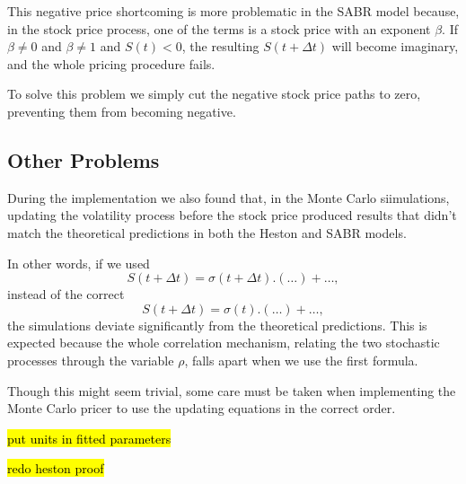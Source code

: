 This negative price shortcoming is more problematic in the SABR model because, in the stock price process, one of the terms is a stock price with an exponent $\beta$. If $\beta\neq0$ and $\beta\neq1$ and $S(t)<0$, the resulting $S(t+\Delta t)$ will become imaginary, and the whole pricing procedure fails.

To solve this problem we simply cut the negative stock price paths to zero, preventing them from becoming negative.



\subsection{Other Problems}
During the implementation we also found that, in the Monte Carlo siimulations, updating the volatility process before the stock price produced results that didn't match the theoretical predictions in both the Heston and SABR models.

In other words, if we used
\begin{equation}
S(t+\Delta t)=\sigma(t+\Delta t).\left(\ldots\right)+\ldots,
\end{equation}
instead of the correct
\begin{equation}
S(t+\Delta t)=\sigma(t).\left(\ldots\right)+\ldots,
\end{equation}
\noindent the simulations deviate significantly from the theoretical predictions.
This is expected because the whole correlation mechanism, relating the two stochastic processes through the variable $\rho$, falls apart when we use the first formula.

Though this might seem trivial, some care must be taken when implementing the Monte Carlo pricer to use the updating equations in the correct order.




\newpage











\hl{put units in fitted parameters}

\hl{redo heston proof}



